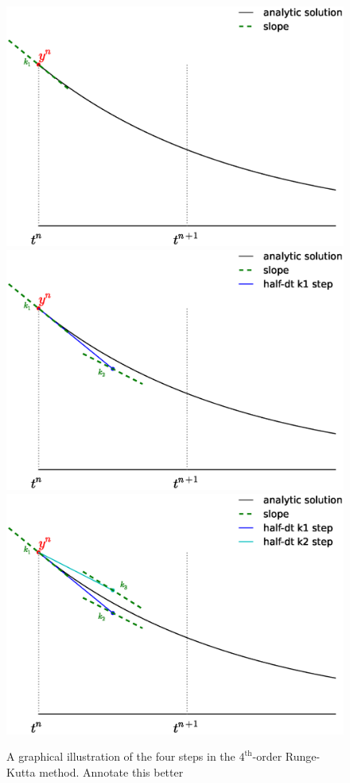 \begin{figure}[t]
\centering
\includegraphics[width=0.65\linewidth]{rk4_k1.eps} \\
\includegraphics[width=0.65\linewidth]{rk4_k2.eps} \\
\includegraphics[width=0.65\linewidth]{rk4_k3.eps} \\
%
\caption[The $4^\mathrm{th}$-order Runge-Kutta method] {\label{fig:rk}
  A graphical illustration of the four steps in the
  $4^\mathrm{th}$-order Runge-Kutta method. {\color{red} Annotate this better}}
\end{figure}

